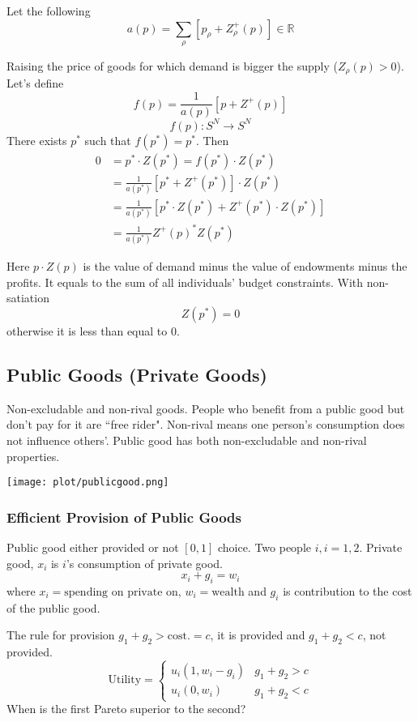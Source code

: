 \documentclass[11pt, a4paper, oneside]{article}
\theoremstyle{definition}
\theoremstyle{proposition}
\theoremstyle{corollary}
\theoremstyle{lemma}
\theoremstyle{theorem}
\begin{document}
Let the following 
$$a(p) = \sum_{\rho} [p_{\rho}+Z_{\rho}^+(p)] \in \mathbb{R}$$ 

Raising the price of goods for which demand is bigger the supply ($Z_{\rho}(p) > 0$). Let's define 
$$f(p) = \frac{1}{a(p)} [p+Z^+(p)]$$
$$f(p): S^N \to S^N$$
There exists $p^*$ such that $f(p^*) = p^*$. Then 
\begin{align*}
0 &= p^*\cdot Z(p^*) = f(p^*) \cdot Z(p^*) \\
&=\frac{1}{a(p^*)}[p^* + Z^+(p^*)]\cdot Z(p^*)\\
&=\frac{1}{a(p^*)}[p^*\cdot Z(p^*) + Z^+(p^*)\cdot Z(p^*)]\\
&=\frac{1}{a(p^*)} Z^+(p)^*Z(p^*)
\end{align*}

Here $p\cdot Z(p)$ is the value of demand minus the value of endowments minus the profits. It equals to the sum of all individuals' budget constraints. With non-satiation 
$$Z(p^*) = 0$$ otherwise it is less than equal to 0.

\subsection{Public Goods (Private Goods)} 
Non-excludable and non-rival goods. People who benefit from a public good but don't pay for it are ``free rider". Non-rival means one person's consumption does not influence others'. Public good has both non-excludable and non-rival properties. 

\begin{center}
\texttt{[image: plot/publicgood.png]}
\end{center}

\subsubsection{Efficient Provision of Public Goods}
Public good either provided or not $[0, 1]$ choice. Two people $i, i = 1, 2$. Private good, $x_i$ is $i$'s consumption of private good. 
$$x_i + g_i = w_i$$ 
where $x_i = \text{spending on private on}$, $w_i = \text{wealth}$ and $g_i$ is contribution to the cost of the public good. 

The rule for provision $g_1+g_2 > \text{cost}. =c$, it is provided and $g_1 + g_2 < c$, not provided. 
$$\text{Utility} = \begin{cases}
u_i(1, w_i- g_i) & g_1 + g_2 > c\\
u_i(0, w_i) & g_1 + g_2 < c
\end{cases}$$
When is the first Pareto superior to the second? 
\end{document}
